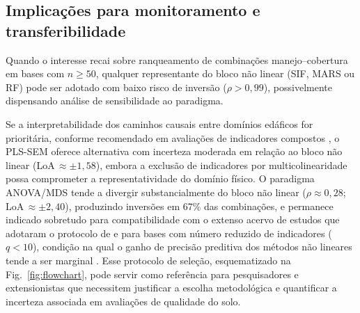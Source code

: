 \documentclass[pdflatex,sn-basic]{sn-jnl}%
\begin{document}
\subsection{Implicações para monitoramento e transferibilidade}\label{subsec:implications}

Quando o interesse recai sobre ranqueamento de combinações manejo--cobertura em bases com $n \geq 50$, qualquer representante do bloco não linear (SIF, MARS ou RF) pode ser adotado com baixo risco de inversão ($\rho > 0{,}99$), possivelmente dispensando análise de sensibilidade ao paradigma.

Se a interpretabilidade dos caminhos causais entre domínios edáficos for prioritária, conforme recomendado em avaliações de indicadores compostos \citep{Cardoso2013}, o PLS-SEM oferece alternativa com incerteza moderada em relação ao bloco não linear (LoA\,$\approx \pm 1{,}58$), embora a exclusão de indicadores por multicolinearidade possa comprometer a representatividade do domínio físico. O paradigma ANOVA/MDS tende a divergir substancialmente do bloco não linear ($\rho \approx 0{,}28$; LoA\,$\approx \pm 2{,}40$), produzindo inversões em 67\% das combinações, e permanece indicado sobretudo para compatibilidade com o extenso acervo de estudos que adotaram o protocolo de \cite{Andrews2002} e para bases com número reduzido de indicadores ($q < 10$), condição na qual o ganho de precisão preditiva dos métodos não lineares tende a ser marginal \citep{Bunemann2018}. Esse protocolo de seleção, esquematizado na Fig.~\ref{fig:flowchart}, pode servir como referência para pesquisadores e extensionistas que necessitem justificar a escolha metodológica e quantificar a incerteza associada em avaliações de qualidade do solo.
\end{document}
